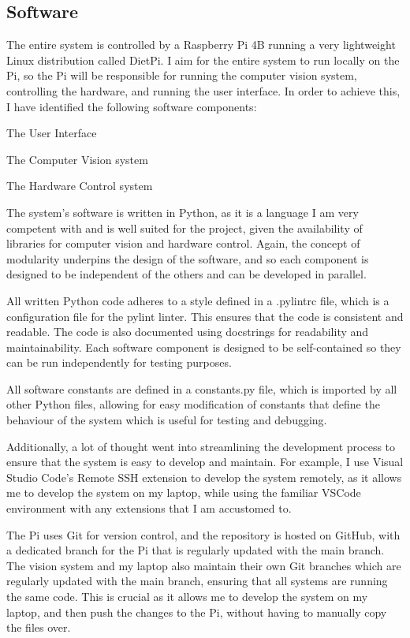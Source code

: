 \subsection{Software}
The entire system is controlled by a Raspberry Pi 4B running a very lightweight Linux distribution called DietPi\cite{dietpi}.
I aim for the entire system to run locally on the Pi, so the Pi will be responsible for running the computer vision system,
controlling the hardware, and running the user interface. In order to achieve this, I have identified the following software components:
\begin{mylist}
  \item The User Interface
  \item The Computer Vision system
  \item The Hardware Control system
\end{mylist}
\noindent
The system's software is written in Python\cite{python}, as it is a language I am very competent with and is well suited for the project, given the 
availability of libraries for computer vision and hardware control. Again, the concept of modularity underpins the design of the software,
and so each component is designed to be independent of the others and can be developed in parallel.

All written Python code adheres to a style defined in a .pylintrc file, which is a configuration file for the pylint\cite{pylint} linter. This ensures
that the code is consistent and readable. The code is also documented using docstrings for 
readability and maintainability. Each software component is designed to be self-contained so they can be run independently for testing purposes.

All software constants are defined in a constants.py file, which is imported by all other Python files, allowing for easy modification of constants
that define the behaviour of the system which is useful for testing and debugging.

Additionally, a lot of thought went into streamlining the development process to ensure that the system is easy to develop and maintain. For example,
I use Visual Studio Code's\cite{vscode} Remote SSH extension to develop the system remotely, as it allows me to develop the system on my laptop, while
using the familiar VSCode environment with any extensions that I am accustomed to.

The Pi uses Git\cite{git} for version control, and the repository is hosted on GitHub\cite{github}, with a dedicated branch for the Pi that is regularly
updated with the main branch. The vision system and my laptop also maintain their own Git branches which are regularly updated with the main branch, ensuring 
that all systems are running the same code. This is crucial as it allows me to develop the system on my laptop, and then push the changes to the Pi, without
having to manually copy the files over.

